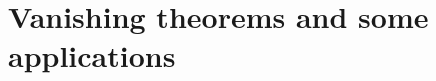 \documentclass[dvipdfmx]{jsarticle}
\begin{document}
\section{Vanishing theorems and some applications}

\end{document}
